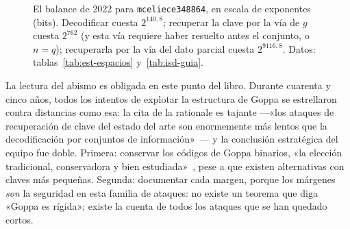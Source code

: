 \documentclass[11pt,a4paper,oneside]{report}
\begin{document}
\begin{figure}[htbp]
\centering
{}
\caption{El balance de 2022 para \texttt{mceliece348864}, en escala
de exponentes (bits). Decodificar cuesta $2^{140{,}8}$; recuperar la
clave por la vía de $g$ cuesta $2^{762}$ (y esta vía requiere haber
resuelto antes el conjunto, o $n=q$); recuperarla por la vía del
dato parcial cuesta $2^{9116{,}8}$. Datos:
tablas~\ref{tab:est-espacios} y~\ref{tab:isd-guia}.}
\label{fig:est-abismo}
\end{figure}

La lectura del abismo es obligada en este punto del libro. Durante
cuarenta y cinco años, todos los intentos de explotar la estructura
de Goppa se estrellaron contra distancias como esa: la cita de la
rationale es tajante ---«los ataques de recuperación de clave del
estado del arte son enormemente más lentos que la decodificación por
conjuntos de información»~\cite{cmrationale}--- y la conclusión
estratégica del equipo fue doble. Primera: conservar los códigos de
Goppa binarios, «la elección tradicional, conservadora y bien
estudiada»~\cite{cmrationale}, pese a que existen alternativas con
claves más pequeñas. Segunda: documentar cada margen, porque los
márgenes \emph{son} la seguridad en esta familia de ataques: no
existe un teorema que diga «Goppa es rígida»; existe la cuenta de
todos los ataques que se han quedado cortos.
\end{document}
